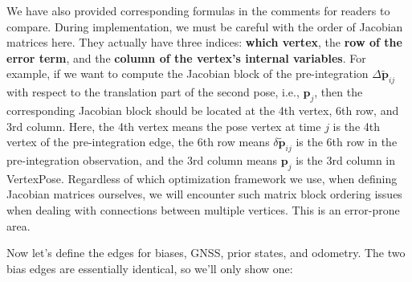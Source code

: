 We have also provided corresponding formulas in the comments for readers to compare. During implementation, we must be careful with the order of Jacobian matrices here. They actually have three indices: \textbf{which vertex}, the \textbf{row of the error term}, and the \textbf{column of the vertex's internal variables}. For example, if we want to compute the Jacobian block of the pre-integration $\Delta \tilde{\mathbf{p}}_{ij}$ with respect to the translation part of the second pose, i.e., $\mathbf{p}_j$, then the corresponding Jacobian block should be located at the 4th vertex, 6th row, and 3rd column. Here, the 4th vertex means the pose vertex at time $j$ is the 4th vertex of the pre-integration edge, the 6th row means $\delta \tilde{\mathbf{p}}_{ij}$ is the 6th row in the pre-integration observation, and the 3rd column means $\mathbf{p}_j$ is the 3rd column in VertexPose. Regardless of which optimization framework we use, when defining Jacobian matrices ourselves, we will encounter such matrix block ordering issues when dealing with connections between multiple vertices. This is an error-prone area.

Now let's define the edges for biases, GNSS, prior states, and odometry. The two bias edges are essentially identical, so we'll only show one:

